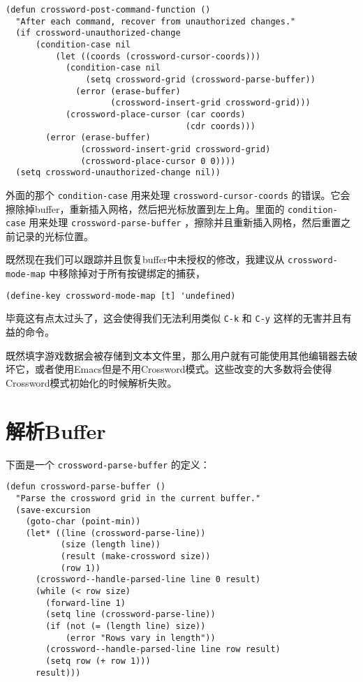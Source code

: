 \begin{verbatim}
(defun crossword-post-command-function ()
  "After each command, recover from unauthorized changes."
  (if crossword-unauthorized-change
      (condition-case nil
          (let ((coords (crossword-cursor-coords)))
            (condition-case nil
                (setq crossword-grid (crossword-parse-buffer))
              (error (erase-buffer)
                     (crossword-insert-grid crossword-grid)))
            (crossword-place-cursor (car coords)
                                    (cdr coords)))
        (error (erase-buffer)
               (crossword-insert-grid crossword-grid)
               (crossword-place-cursor 0 0))))
  (setq crossword-unauthorized-change nil))
\end{verbatim}

外面的那个 \texttt{condition-case} 用来处理 \texttt{crossword-cursor-coords} 的错误。它会擦除掉buffer，重新插入网格，然后把光标放置到左上角。里面的 \texttt{condition-case} 用来处理 \texttt{crossword-parse-buffer} ，擦除并且重新插入网格，然后重置之前记录的光标位置。

既然现在我们可以跟踪并且恢复buffer中未授权的修改，我建议从 \texttt{crossword-mode-map} 中移除掉对于所有按键绑定的捕获，

\begin{verbatim}
(define-key crossword-mode-map [t] 'undefined)
\end{verbatim}

毕竟这有点太过头了，这会使得我们无法利用类似 \verb|C-k| 和 \verb|C-y| 这样的无害并且有益的命令。

既然填字游戏数据会被存储到文本文件里，那么用户就有可能使用其他编辑器去破坏它，或者使用Emacs但是不用Crossword模式。这些改变的大多数将会使得Crossword模式初始化的时候解析失败。

\section{解析Buffer}
\label{section:10-Parsing-the-Buffer}

下面是一个 \texttt{crossword-parse-buffer} 的定义：

\begin{verbatim}
(defun crossword-parse-buffer ()
  "Parse the crossword grid in the current buffer."
  (save-excursion
    (goto-char (point-min))
    (let* ((line (crossword-parse-line))
           (size (length line))
           (result (make-crossword size))
           (row 1))
      (crossword--handle-parsed-line line 0 result)
      (while (< row size)
        (forward-line 1)
        (setq line (crossword-parse-line))
        (if (not (= (length line) size))
            (error "Rows vary in length"))
        (crossword--handle-parsed-line line row result)
        (setq row (+ row 1)))
      result)))
\end{verbatim}

